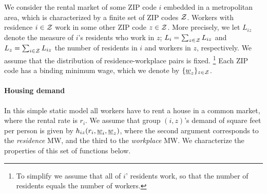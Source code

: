 We consider the rental market of some ZIP code $i$ embedded in a metropolitan area, 
which is characterized by a finite set of ZIP codes $\mathcal{Z}$.
Workers with residence $i\in\mathcal{Z}$ work in some other ZIP code $z\in\mathcal{Z}$. 
More precisely, we let $L_{iz}$ denote the measure of $i$'s residents who work in $z$;
$L_i = \sum_{z \in \mathcal{Z}} L_{iz}$ and $L_z = \sum_{i \in \mathcal{Z}} L_{iz}$ 
the number of residents in $i$ and workers in $z$, respectively.
We assume that the distribution of residence-workplace pairs is fixed.%
\footnote{To simplify we assume that all of $i$' residents work, so that the number
of residents equals the number of workers.}
Each ZIP code has a binding minimum wage, which we denote by 
$\{\underline{w}_z\}_{z\in\mathcal{Z}}$.

\paragraph{Housing demand}

In this simple static model all workers have to rent a house in a common market, 
where the rental rate is $r_i$.
We assume that group $(i,z)$'s demand of square feet per person is given by $h_{iz}
(r_i, \underline{w}_i, \underline{w}_z)$, where the second argument corresponds to the \textit{residence} 
MW, and the third to the \textit{workplace} MW.
We characterize the properties of this set of functions below.

